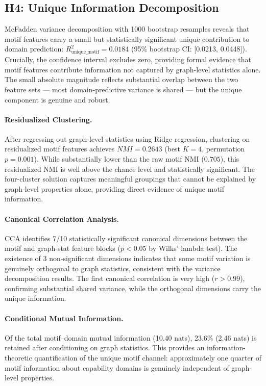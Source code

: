 \subsection{H4: Unique Information Decomposition}\label{sec:results_h4}

McFadden variance decomposition with 1000 bootstrap resamples reveals that motif features carry a small but statistically significant unique contribution to domain prediction: $R^2_{\text{unique\_motif}}=0.0184$ (95\% bootstrap CI: [0.0213, 0.0448]). Crucially, the confidence interval excludes zero, providing formal evidence that motif features contribute information not captured by graph-level statistics alone. The small absolute magnitude reflects substantial overlap between the two feature sets --- most domain-predictive variance is shared --- but the unique component is genuine and robust.

\paragraph{Residualized Clustering.}
After regressing out graph-level statistics using Ridge regression, clustering on residualized motif features achieves $NMI=0.2643$ (best $K=4$, permutation $p=0.001$). While substantially lower than the raw motif NMI ($0.705$), this residualized NMI is well above the chance level and statistically significant. The four-cluster solution captures meaningful groupings that cannot be explained by graph-level properties alone, providing direct evidence of unique motif information.

\paragraph{Canonical Correlation Analysis.}
CCA identifies 7/10 statistically significant canonical dimensions between the motif and graph-stat feature blocks ($p<0.05$ by Wilks' lambda test). The existence of 3 non-significant dimensions indicates that some motif variation is genuinely orthogonal to graph statistics, consistent with the variance decomposition results. The first canonical correlation is very high ($r>0.99$), confirming substantial shared variance, while the orthogonal dimensions carry the unique information.

\paragraph{Conditional Mutual Information.}
Of the total motif--domain mutual information (10.40 nats), 23.6\% (2.46 nats) is retained after conditioning on graph statistics. This provides an information-theoretic quantification of the unique motif channel: approximately one quarter of motif information about capability domains is genuinely independent of graph-level properties.

